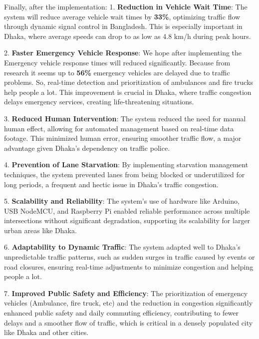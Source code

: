 \documentclass[usenatbib]{tjaa}
\begin{document}
Finally, after the implementation:
1. \textbf{Reduction in Vehicle Wait Time}:  
   The system will reduce average vehicle wait times by \textbf{33\%}, optimizing traffic flow through dynamic signal control in Bangladesh. This is especially important in Dhaka, where average speeds can drop to as low as 4.8 km/h during peak hours.

2. \textbf{Faster Emergency Vehicle Response}:  
   We hope after implementing the Emergency vehicle response times will reduced significantly. Because from research it seems up to \textbf{56\%} emergency vehicles are delayed due to traffic problems. So, real-time detection and prioritization of ambulances and fire trucks help people a lot. This improvement is crucial in Dhaka, where traffic congestion delays emergency services, creating life-threatening situations.

3. \textbf{Reduced Human Intervention}:  
   The system reduced the need for manual human effect, allowing for automated management based on real-time data footage. This minimized human error, ensuring smoother traffic flow, a major advantage given Dhaka’s dependency on traffic police.

4. \textbf{Prevention of Lane Starvation}:  
   By implementing starvation management techniques, the system prevented lanes from being blocked or underutilized for long periods, a frequent and hectic issue in Dhaka’s traffic congestion.

5. \textbf{Scalability and Reliability}:  
   The system’s use of hardware like Arduino, USB NodeMCU, and Raspberry Pi enabled reliable performance across multiple intersections without significant degradation, supporting its scalability for larger urban areas like Dhaka.

6. \textbf{Adaptability to Dynamic Traffic}:  
   The system adapted well to Dhaka’s unpredictable traffic patterns, such as sudden surges in traffic caused by events or road closures, ensuring real-time adjustments to minimize congestion and helping people a lot.

7. \textbf{Improved Public Safety and Efficiency}:  
   The prioritization of emergency vehicles (Ambulance, fire truck, etc) and the reduction in congestion significantly enhanced public safety and daily commuting efficiency, contributing to fewer delays and a smoother flow of traffic, which is critical in a densely populated city like Dhaka and other cities.
\end{document}

